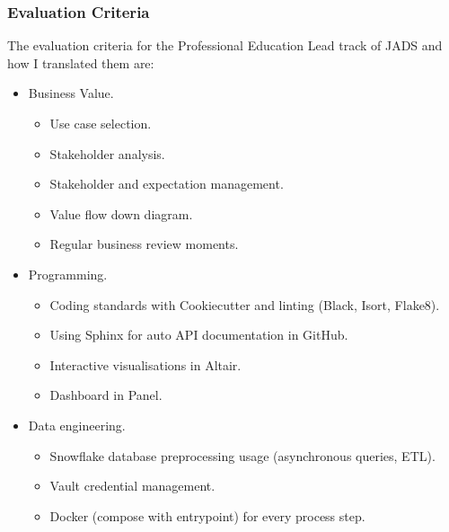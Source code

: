 \documentclass[letterpaper,10pt,english]{sphinxmanual}
\begin{document}
\subsubsection{Evaluation Criteria}
\label{\detokenize{deployment:evaluation-criteria}}
The evaluation criteria for the Professional Education Lead track of JADS and how I translated them are:
\begin{itemize}
\item {} 
Business Value.
\begin{itemize}
\item {} 
Use case selection.

\item {} 
Stakeholder analysis.

\item {} 
Stakeholder and expectation management.

\item {} 
Value flow down diagram.

\item {} 
Regular business review moments.

\end{itemize}

\item {} 
Programming.
\begin{itemize}
\item {} 
Coding standards with Cookiecutter and linting (Black, Isort, Flake8).

\item {} 
Using Sphinx for auto API documentation in GitHub.

\item {} 
Interactive visualisations in Altair.

\item {} 
Dashboard in Panel.

\end{itemize}

\item {} 
Data engineering.
\begin{itemize}
\item {} 
Snowflake database preprocessing usage (asynchronous queries, ETL).

\item {} 
Vault credential management.

\item {} 
Docker (compose with entrypoint) for every process step.

\end{itemize}


\end{itemize}
\end{document}
